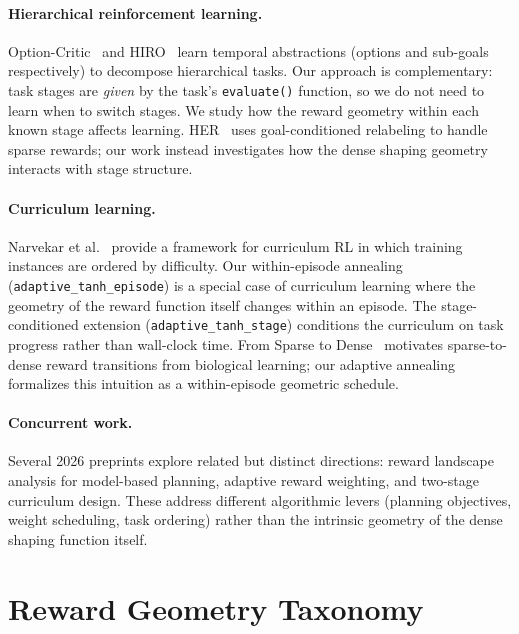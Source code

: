 \documentclass{article}
\begin{document}
\paragraph{Hierarchical reinforcement learning.}
Option-Critic~\citep{bacon2017option} and HIRO~\citep{nachum2018hiro} learn temporal
abstractions (options and sub-goals respectively) to decompose hierarchical tasks.
Our approach is complementary: task stages are \emph{given} by the task's
\texttt{evaluate()} function, so we do not need to learn when to switch stages.
We study how the reward geometry within each known stage affects learning.
HER~\citep{andrychowicz2017her} uses goal-conditioned relabeling to handle sparse
rewards; our work instead investigates how the dense shaping geometry interacts with
stage structure.

\paragraph{Curriculum learning.}
Narvekar et al.~\citep{narvekar2020curriculum} provide a framework for curriculum RL
in which training instances are ordered by difficulty. Our within-episode annealing
(\texttt{adaptive\_tanh\_episode}) is a special case of curriculum learning where the
geometry of the reward function itself changes within an episode. The stage-conditioned
extension (\texttt{adaptive\_tanh\_stage}) conditions the curriculum on task progress
rather than wall-clock time.
From Sparse to Dense~\citep{hao2025toddler} motivates sparse-to-dense reward
transitions from biological learning; our adaptive annealing formalizes this intuition
as a within-episode geometric schedule.

\paragraph{Concurrent work.}
Several 2026 preprints explore related but distinct directions: reward landscape
analysis for model-based planning, adaptive reward weighting, and two-stage curriculum
design. These address different algorithmic levers (planning objectives, weight
scheduling, task ordering) rather than the intrinsic geometry of the dense shaping
function itself.

\section{Reward Geometry Taxonomy}
\label{sec:taxonomy}
\end{document}
